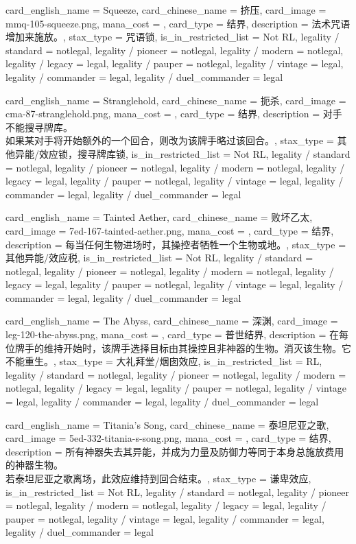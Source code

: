 \documentclass[lang = cn, color = black, 10pt]{AllThatStax}
\begin{document}
\card
{
	card_english_name = {Squeeze},
	card_chinese_name = {挤压},
	card_image = mmq-105-squeeze.png,
	mana_cost = ,
	card_type = 结界,
	description = {法术咒语增加来施放。},
	stax_type = 咒语锁,
	is_in_restricted_list = Not RL,
	legality / standard = notlegal,
	legality / pioneer = notlegal,
	legality / modern = notlegal,
	legality / legacy = legal,
	legality / pauper = notlegal,
	legality / vintage = legal,
	legality / commander = legal,
	legality / duel_commander = legal
}

\card
{
	card_english_name = {Stranglehold},
	card_chinese_name = {扼杀},
	card_image = cma-87-stranglehold.png,
	mana_cost = ,
	card_type = 结界,
	description = {对手不能搜寻牌库。\\
如果某对手将开始额外的一个回合，则改为该牌手略过该回合。},
	stax_type = 其他异能/效应锁，搜寻牌库锁,
	is_in_restricted_list = Not RL,
	legality / standard = notlegal,
	legality / pioneer = notlegal,
	legality / modern = notlegal,
	legality / legacy = legal,
	legality / pauper = notlegal,
	legality / vintage = legal,
	legality / commander = legal,
	legality / duel_commander = legal
}

\card
{
	card_english_name = {Tainted Aether},
	card_chinese_name = {败坏乙太},
	card_image = 7ed-167-tainted-aether.png,
	mana_cost = ,
	card_type = 结界,
	description = {每当任何生物进场时，其操控者牺牲一个生物或地。},
	stax_type = 其他异能/效应税,
	is_in_restricted_list = Not RL,
	legality / standard = notlegal,
	legality / pioneer = notlegal,
	legality / modern = notlegal,
	legality / legacy = legal,
	legality / pauper = notlegal,
	legality / vintage = legal,
	legality / commander = legal,
	legality / duel_commander = legal
}

\card
{
	card_english_name = {The Abyss},
	card_chinese_name = {深渊},
	card_image = leg-120-the-abyss.png,
	mana_cost = ,
	card_type = 普世结界,
	description = {在每位牌手的维持开始时，该牌手选择目标由其操控且非神器的生物。消灭该生物。它不能重生。},
	stax_type = 大礼拜堂/烟囱效应,
	is_in_restricted_list = RL,
	legality / standard = notlegal,
	legality / pioneer = notlegal,
	legality / modern = notlegal,
	legality / legacy = legal,
	legality / pauper = notlegal,
	legality / vintage = legal,
	legality / commander = legal,
	legality / duel_commander = legal
}

\card
{
	card_english_name = {Titania's Song},
	card_chinese_name = {泰坦尼亚之歌},
	card_image = 5ed-332-titania-s-song.png,
	mana_cost = ,
	card_type = 结界,
	description = {所有神器失去其异能，并成为力量及防御力等同于本身总施放费用的神器生物。\\
若泰坦尼亚之歌离场，此效应维持到回合结束。},
	stax_type = 谦卑效应,
	is_in_restricted_list = Not RL,
	legality / standard = notlegal,
	legality / pioneer = notlegal,
	legality / modern = notlegal,
	legality / legacy = legal,
	legality / pauper = notlegal,
	legality / vintage = legal,
	legality / commander = legal,
	legality / duel_commander = legal
}
\end{document}
